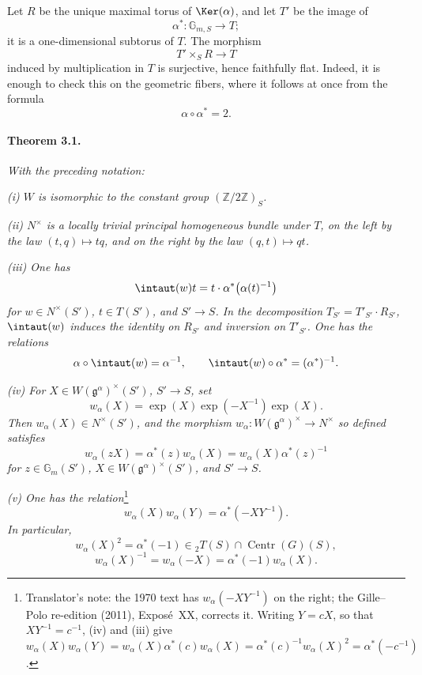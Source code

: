 Let \(R\) be the unique maximal torus of \(\Ker(\alpha)\), and let
\(T'\) be the image of
\[
  \alpha^\ast\colon\mathbb G_{m,S}\longrightarrow T;
\]
it is a one-dimensional subtorus of \(T\).  The morphism
\[
  T'\times_S R\longrightarrow T
\]
induced by multiplication in \(T\) is surjective, hence faithfully
flat.  Indeed, it is enough to check this on the geometric fibers,
where it follows at once from the formula
\[
  \alpha\circ\alpha^\ast=2.
\]

\paragraph{\textbf{Theorem 3.1.}}
\emph{With the preceding notation:}

\smallskip
\noindent\emph{\textup{(i)} \(W\) is isomorphic to the constant group
\((\mathbb Z/2\mathbb Z)_S\).}

\smallskip
\noindent\emph{\textup{(ii)} \(N^\times\) is a locally trivial
principal homogeneous bundle under \(T\), on the left by the law
\((t,q)\mapsto tq\), and on the right by the law
\((q,t)\mapsto qt\).}

\smallskip
\noindent\emph{\textup{(iii)} One has}
\[
  \intaut(w)t=t\cdot\alpha^\ast\bigl(\alpha(t)^{-1}\bigr)
\]
\emph{for \(w\in N^\times(S')\), \(t\in T(S')\), and \(S'\to S\).
In the decomposition \(T_{S'}=T'_{S'}\cdot R_{S'}\),
\(\intaut(w)\) induces the identity on \(R_{S'}\) and inversion on
\(T'_{S'}\).  One has the relations}
\[
  \alpha\circ\intaut(w)=\alpha^{-1},
  \qquad
  \intaut(w)\circ\alpha^\ast=(\alpha^\ast)^{-1}.
\]

\smallskip
\noindent\emph{\textup{(iv)} For
\(X\in W(\mathfrak g^\alpha)^\times(S')\), \(S'\to S\), set}
\[
  w_\alpha(X)
    =\exp(X)\exp(-X^{-1})\exp(X).
\]
\emph{Then \(w_\alpha(X)\in N^\times(S')\), and the morphism
\(w_\alpha\colon W(\mathfrak g^\alpha)^\times\to N^\times\) so
defined satisfies}
\[
  w_\alpha(zX)
    =\alpha^\ast(z)w_\alpha(X)
    =w_\alpha(X)\alpha^\ast(z)^{-1}
\]
\emph{for \(z\in\mathbb G_m(S')\),
\(X\in W(\mathfrak g^\alpha)^\times(S')\), and \(S'\to S\).}

\smallskip
\noindent\emph{\textup{(v)} One has the relation}\footnote{Translator's note: the 1970 text has
\(w_\alpha(-XY^{-1})\) on the right; the Gille--Polo re-edition (2011), Exposé~XX, corrects it.
Writing \(Y=cX\), so that \(XY^{-1}=c^{-1}\), \textup{(iv)} and \textup{(iii)} give
\(w_\alpha(X)w_\alpha(Y)=w_\alpha(X)\alpha^\ast(c)w_\alpha(X)
=\alpha^\ast(c)^{-1}w_\alpha(X)^2=\alpha^\ast(-c^{-1})\).}
\[
  w_\alpha(X)w_\alpha(Y)=\alpha^\ast(-XY^{-1}).
\]
\emph{In particular,}
\[
  w_\alpha(X)^2
    =\alpha^\ast(-1)
    \in {}_2T(S)\cap\operatorname{Centr}(G)(S),
\]
\[
  w_\alpha(X)^{-1}
    =w_\alpha(-X)
    =\alpha^\ast(-1)w_\alpha(X).
\]


